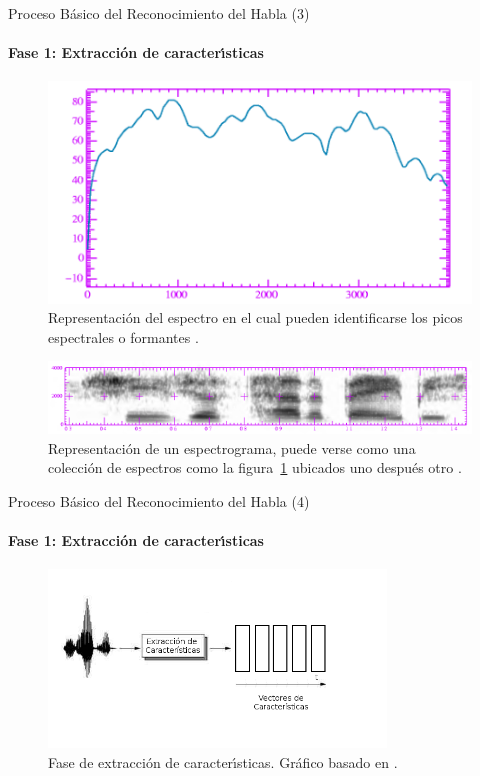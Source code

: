 \begin{frame}{Proceso B\'asico del Reconocimiento del Habla (3)}
\framesubtitle{Fase 1: Extracci\'on de caracter{\'\i}sticas}
\begin{figure}[H]
\centering
\includegraphics[width=0.4\linewidth]{./graphics/formants.png}
\caption{Representaci\'on del espectro en el cual pueden identificarse los picos espectrales o formantes 
\cite{Jurafsky}.}
\label{figure:formants}
\end{figure}


\begin{figure}[H]
\centering
\includegraphics[width=0.7\linewidth]{./graphics/spectrogram.png}
\caption{Representaci\'on de un espectrograma, puede verse como una colecci\'on de espectros como la 
    figura~\ref{figure:formants} ubicados uno despu\'es otro \cite{Jurafsky}.}
\label{figure:spectrogram}
\end{figure}

\end{frame}

\begin{frame}{Proceso B\'asico del Reconocimiento del Habla (4)}
\framesubtitle{Fase 1: Extracci\'on de caracter{\'\i}sticas}

\begin{figure}[H] 
\centering
\includegraphics[width=0.8\textwidth]{./graphics/extraccion.png}
\caption{Fase de extracci\'on de caracter{\'\i}sticas. Gr\'afico basado en \cite{VerenichASR}.}
\label{figure:hmm}
\end{figure}
\end{frame}


